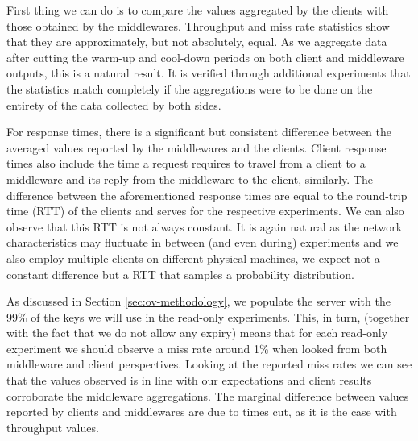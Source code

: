 \documentclass[11pt,a4paper]{article}
\begin{document}
\par First thing we can do is to compare the values aggregated by the clients with those obtained by the middlewares. Throughput and miss rate statistics show that they are approximately, but not absolutely, equal. As we aggregate data after cutting the warm-up and cool-down periods on both client and middleware outputs, this is a natural result. It is verified through additional experiments that the statistics match completely if the aggregations were to be done on the entirety of the data collected by both sides.
\par For response times, there is a significant but consistent difference between the averaged values reported by the middlewares and the clients. Client response times also include the time a request requires to travel from a client to a middleware and its reply from the middleware to the client, similarly. The difference between the aforementioned response times are equal to the round-trip time (RTT) of the clients and serves for the respective experiments. We can also observe that this RTT is not always constant. It is again natural as the network characteristics may fluctuate in between (and even during) experiments and we also employ multiple clients on different physical machines, we expect not a constant difference but a RTT that samples a probability distribution.
\par As discussed in Section \ref{sec:ov-methodology}, we populate the server with the 99\% of the keys we will use in the read-only experiments. This, in turn, (together with the fact that we do not allow any expiry) means that for each read-only experiment we should observe a miss rate around 1\% when looked from both middleware and client perspectives. Looking at the reported miss rates we can see that the values observed is in line with our expectations and client results corroborate the middleware aggregations. The marginal difference between values reported by clients and middlewares are due to times cut, as it is the case with throughput values.
\\
\end{document}
